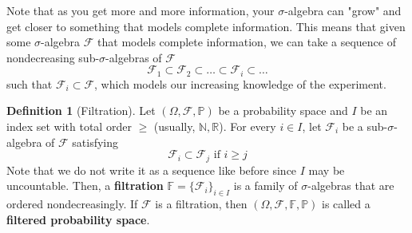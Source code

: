 \documentclass{article}
\theoremstyle{definition}
\theoremstyle{remark}
\theoremstyle{definition}
\newtheorem{definition}{Definition}[section]
\begin{document}
Note that as you get more and more information, your $\sigma$-algebra can "grow" and get closer to something that models complete information. This means that given some $\sigma$-algebra $\mathcal{F}$ that models complete information, we can take a sequence of nondecreasing sub-$\sigma$-algebras of $\mathcal{F}$ 
\[\mathcal{F}_1 \subset \mathcal{F}_2 \subset \ldots \subset \mathcal{F}_i \subset \ldots \]
such that $\mathcal{F}_i \subset \mathcal{F}$, which models our increasing knowledge of the experiment. 

\begin{definition}[Filtration]
Let $(\Omega, \mathcal{F}, \mathbb{P})$ be a probability space and $I$ be an index set with total order $\geq$ (usually, $\mathbb{N}, \mathbb{R}$). For every $i \in I$, let $\mathcal{F}_i$ be a sub-$\sigma$-algebra of $\mathcal{F}$ satisfying 
\[\mathcal{F}_i \subset \mathcal{F}_j \text{ if } i \geq j\]
Note that we do not write it as a sequence like before since $I$ may be uncountable. Then, a \textbf{filtration} $\mathbb{F} = \{\mathcal{F}_i\}_{i \in I}$ is a family of $\sigma$-algebras that are ordered nondecreasingly. If $\mathcal{F}$ is a filtration, then $(\Omega, \mathcal{F}, \mathbb{F}, \mathbb{P})$ is called a \textbf{filtered probability space}. 
\end{definition}
\end{document}
